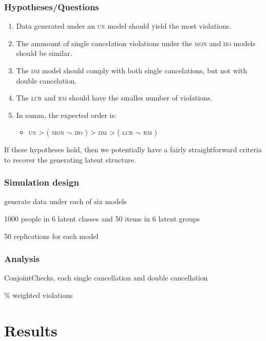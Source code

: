 \documentclass[10pt,serif,professionalfont]{beamer}
\begin{document}
\begin{frame}
    \frametitle{Hypotheses/Questions }
    
    \begin{enumerate}
    \item Data generated under an \textsc{un} model should yield the most violations.
    \item The ammount of single cancelation violations under the \textsc{mon} and \textsc{iio} models should be similar.
    \item The \textsc{dm} model should comply with both single cancelations, but not with double cancelation.
    \item The \textsc{lcr} and \textsc{rm} should have the smalles number of violations.
    \item In summ, the expected order is:
        \begin{itemize}
            \item \textsc{un} > ( \textsc{mon} $\sim$ \textsc{iio} ) > \textsc{dm} > ( \textsc{lcr} $\sim$ \textsc{rm} )
        \end{itemize}
    \end{enumerate}
    
    If these hypotheses hold, then we potentially have a fairly straightforward criteria to recover the generating latent structure. 

\end{frame}

\begin{frame}
    \frametitle{Simulation design}

    generate data under each of six models
    
    1000 people in 6 latent classes and 50 items in 6 latent groups
    
    50 replications for each model

\end{frame}

\begin{frame}
    \frametitle{Analysis}

    ConjointChecks, each single cancellation and double cancellation
    
    \% weighted violations

\end{frame}


\section{Results}
\end{document}
